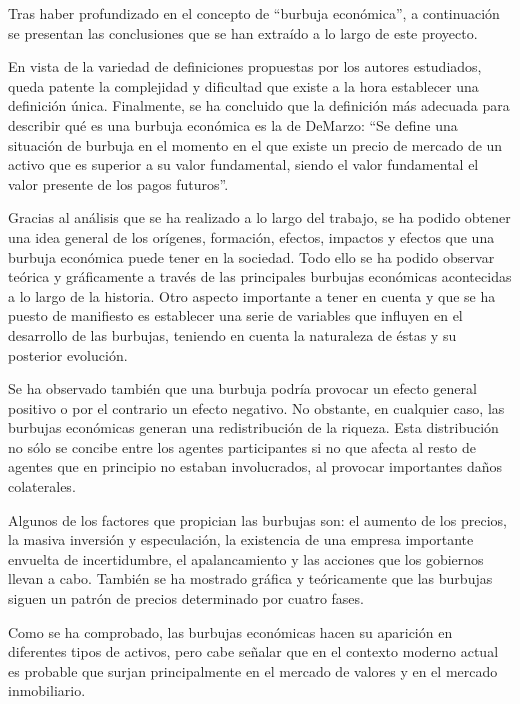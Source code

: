 Tras haber profundizado en el concepto de “burbuja económica”, a continuación se presentan las conclusiones que se han extraído a lo largo de este proyecto. 

En vista de la variedad de definiciones propuestas por los autores estudiados, queda patente la complejidad y dificultad que existe a la hora establecer una definición única. Finalmente, se ha concluido que la definición más adecuada para describir qué es una burbuja económica es la de DeMarzo: “Se define una situación de burbuja en el momento en el que existe un precio de mercado de un activo que es superior a su valor fundamental, siendo el valor fundamental el valor presente de los pagos futuros”.

Gracias al análisis que se ha realizado a lo largo del trabajo, se ha podido obtener una idea general de los orígenes, formación, efectos, impactos y efectos que una burbuja económica puede tener en la sociedad. Todo ello se ha podido observar teórica y gráficamente a través de las principales burbujas económicas acontecidas a lo largo de la historia. Otro aspecto importante a tener en cuenta y que se ha puesto de manifiesto es establecer una serie de variables que influyen en el desarrollo de las burbujas, teniendo en cuenta la naturaleza de éstas y su posterior evolución.

Se ha observado también que una burbuja podría provocar un efecto general positivo o por el contrario un efecto negativo. No obstante, en cualquier caso, las burbujas económicas generan una redistribución de la riqueza. Esta distribución no sólo se concibe entre los agentes participantes si no que afecta al resto de agentes que en principio no estaban involucrados, al provocar importantes daños colaterales.

Algunos de los factores que propician las burbujas son: el aumento de los precios, la masiva inversión y especulación, la existencia de una empresa importante envuelta de incertidumbre, el apalancamiento y las acciones que los gobiernos llevan a cabo. También se ha mostrado gráfica y teóricamente que las burbujas siguen un patrón de precios determinado por cuatro fases.

Como se ha comprobado, las burbujas económicas hacen su aparición en diferentes tipos de activos, pero cabe señalar que en el contexto moderno actual es probable que surjan principalmente en el mercado de valores y en el mercado inmobiliario.

